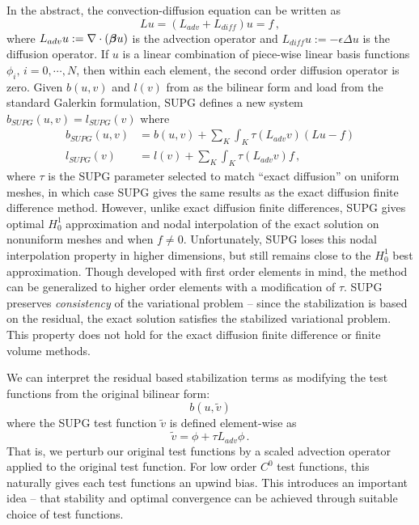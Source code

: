 \documentclass[Proposal.tex]{subfiles}
\begin{document}
In the abstract, the convection-diffusion equation can be written as 
\[
Lu=(L_{adv}+L_{diff})u=f\,,
\]
where $L_{adv}u:=\nabla\cdot(\boldsymbol\beta u)$ is the advection operator and $L_{diff}u:=-\epsilon\Delta u$ is the diffusion operator.
If $u$ is a linear combination of piece-wise linear basis functions $\phi_i,\,i=0,\cdots,N$, then within each element, the second order diffusion operator is zero.
Given $b(u,v)$ and $l(v)$ from as the bilinear form and load from the standard Galerkin formulation, SUPG defines a new system $b_{SUPG}(u,v)=l_{SUPG}(v)$ where
\begin{align*}
	b_{SUPG}(u,v)&=b(u,v)+\sum_K\int_K\tau(L_{adv}v)(Lu-f)\\
	l_{SUPG}(v)&=l(v)+\sum_K\int_K\tau(L_{adv}v)f\,,
\end{align*}
where $\tau$ is the SUPG parameter selected to match ``exact diffusion'' on uniform meshes, in which case SUPG gives the same results as the 
exact diffusion finite difference method.
However, unlike exact diffusion finite differences, SUPG gives optimal $H_0^1$ approximation and nodal interpolation of the exact solution 
on nonuniform meshes and when $f\neq0$.
Unfortunately, SUPG loses this nodal interpolation property in higher dimensions, but still remains close to the $H_0^1$ best approximation.
Though developed with first order elements in mind, the method can be generalized to higher order elements with a modification of $\tau$.
SUPG preserves \emph{consistency} of the variational problem -- since the stabilization is based on the residual, the exact solution 
satisfies the stabilized variational problem. 
This property does not hold for the exact diffusion finite difference or finite volume methods.

We can interpret the residual based stabilization terms as modifying the test functions from the original bilinear form:
\[
b(u,\tilde v)
\]
where the SUPG test function $\tilde v$ is defined element-wise as
\[
\tilde v=\phi+\tau L_{adv}\phi\,.
\]
That is, we perturb our original test functions by a scaled advection operator applied to the original test function.
For low order $C^0$ test functions, this naturally gives each test functions an upwind bias.
This introduces an important idea -- that stability and optimal convergence can be achieved through suitable choice of test functions.
\end{document}
